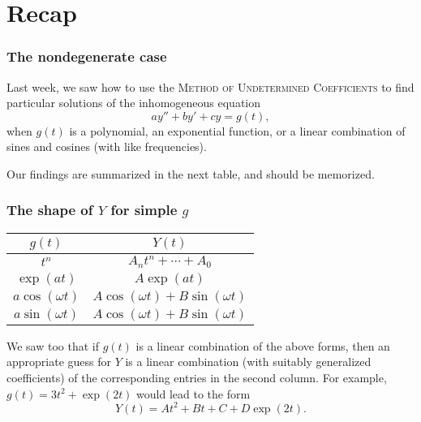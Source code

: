 \def\encoding{UTF-8}

\def\mytitle{Undetermined Coefficients, II}
\def\subtitle{Products and degeneracy}
\def\affiliation{The College of Idaho}
\def\myauthor{Math 352 Differential Equations}
\def\mydate{8 April 2013}
\def\latexmode{beamer}
\def\fonttheme{structurebold}
\def\colortheme{crane}
\def\theme{Szeged}

\def\htmlheaderlevel{2}
\section{Recap}
\label{recap}

\begin{frame}

\frametitle{The nondegenerate case}
\label{thenondegeneratecase}

Last week, we saw how to use the 
\textsc{Method of Undetermined Coefficients}
 to find particular solutions of the inhomogeneous equation
\[
    ay'' + by' + cy = g(t),
\]
when $ g(t) $ is a polynomial, an exponential function, or a linear combination of sines and cosines (with like frequencies).

Our findings are summarized in the next table, and should be memorized.

\end{frame}

\begin{frame}

\frametitle{The shape of $Y$ for simple $ g $}
\label{theshapeofyforsimpleg}

\begin{table}[htbp]
\begin{minipage}{\linewidth}
\setlength{\tymax}{0.5\linewidth}
\centering
\small
\begin{tabulary}{\textwidth}{@{}CC@{}} \toprule
$ g(t) $&$ Y(t) $\\
\midrule
$ t^n $&$ A_n t^n + \cdots + A_ 0 $\\
$ \exp{(at)} $&$ A \exp{(at)} $\\
$ a \cos{(\omega t)} $&$ A \cos{(\omega t)} + B \sin{(\omega t)} $\\
$ a \sin{(\omega t)} $&$ A \cos{(\omega t)} + B \sin{(\omega t)} $\\

\bottomrule

\end{tabulary}
\end{minipage}
\end{table}


We saw too that if $ g(t) $ is a linear combination of the above forms, then an appropriate guess for $ Y $ is a linear combination (with suitably generalized coefficients) of the corresponding entries in the second column. For example, $ g(t) = 3t^2 + \exp{(2t)} $ would lead to the form
\[
    Y(t) = At^2 + Bt + C + D \exp{(2t)}.
\]

\end{frame}


